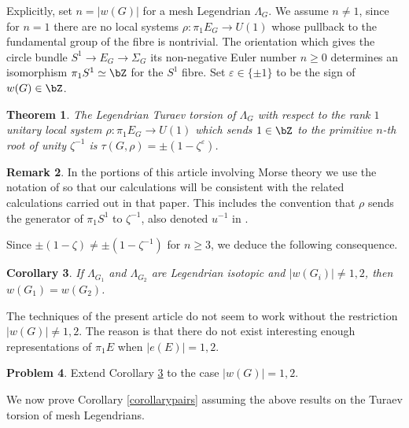 \documentclass[JEP,XML,SOM,Unicode,NoFloatCountersInSection]{cedram}
\theoremstyle{plain}
\newtheorem{theorem}{Theorem}[section]
\newtheorem{corollary}[theorem]{Corollary}
\theoremstyle{definition}
\newtheorem{problem}[theorem]{Problem}
\newtheorem{remark}[theorem]{Remark}
\let\ve\varepsilon
\begin{document}
Explicitly, set $n=|w(G)|$ for a mesh Legendrian $\Lambda_G$. We assume $n \neq 1$, since for $n=1$ there are no local systems $\rho: \pi_1 E_G \to U(1)$ whose pullback to the fundamental group of the fibre is nontrivial. The orientation which gives the circle bundle $S^1 \to E_G \to \Sigma_G$ its non-negative Euler number $n \geq 0$ determines an isomorphism $\pi_1S^1 \simeq \bZ$ for the $S^1$ fibre. Set $\ve \in \{ \pm 1 \}$ to be the sign of $w(G) \in \bZ$.

\begin{theorem}\label{calculation} The Legendrian Turaev torsion of $\Lambda_G$ with respect to the rank $1$ unitary local system $\rho:\pi_1E_G \to U(1)$ which sends $1 \in \bZ$ to the primitive $n$-th root of unity $\zeta^{-1}$ is $\tau(G, \rho)=\pm(1-\zeta^\ve)$.
\end{theorem}

\begin{remark}\label{rem: notation of IK}
In the portions of this article involving Morse theory we use the notation of \cite{IK93} so that our calculations will be consistent with the related calculations carried out in that paper. This includes the convention that $\rho$ sends the generator of $\pi_1S^1$ to $\zeta^{-1}$, also denoted $u^{-1}$ in \cite{IK93}.
\end{remark}

Since $\pm(1-\zeta) \neq \pm(1-\zeta^{-1})$ for $n \geq 3$, we deduce the following consequence.

\begin{corollary}\label{turaev}
If $\Lambda_{G_1}$ and $\Lambda_{G_2}$ are Legendrian isotopic and $|w(G_i)| \neq 1,2$, then $w(G_1)=w(G_2)$.
\end{corollary}

The techniques of the present article do not seem to work without the restriction $|w(G)|\neq 1,2$. The reason is that there do not exist interesting enough representations of $\pi_1E$ when $|e(E)| = 1,2$.

\begin{problem}
Extend Corollary \ref{turaev} to the case $|w(G)|=1,2$.
\end{problem}

We now prove Corollary \ref{corollarypairs} assuming the above results on the Turaev torsion of mesh Legendrians.
\end{document}
